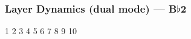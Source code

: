 \subsubsection{Layer Dynamics (dual mode) --- B$\flat$2}










































1
2
3
4
5
6
7
8
9
10

